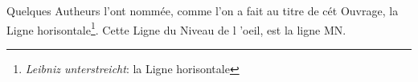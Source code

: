 \pend \pstart[p.~7] Quelques Autheurs l'ont nomm\'{e}e, comme l'on a fait au titre de c\'{e}t Ouvrage, la Ligne horisontale\footnote{\textit{Leibniz unterstreicht}: la Ligne horisontale}. Cette Ligne du Niveau de l 'oeil, est la ligne MN.